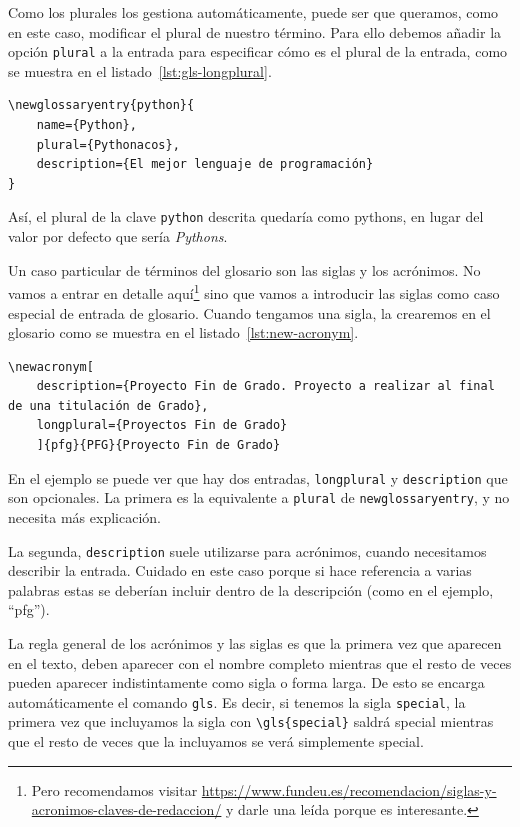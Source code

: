 \documentclass[%
    school=etsisi,%
    type=pfg,%
    degree=61CD,%
]{upm-report}
\begin{document}
Como los plurales los gestiona automáticamente, puede ser que queramos, como en este caso, modificar el plural de nuestro término. Para ello debemos añadir la opción \texttt{plural} a la entrada para especificar cómo es el plural de la entrada, como se muestra en el listado~\ref{lst:gls-longplural}.

\begin{lstlisting}[language={[latex]TeX},caption=Especificando el plural para un término del glosario,label=lst:gls-longplural]
\newglossaryentry{python}{
    name={Python},
    plural={Pythonacos},
    description={El mejor lenguaje de programación}
}
\end{lstlisting}

Así, el plural de la clave \texttt{python} descrita quedaría como \glspl{python}, en lugar del valor por defecto que sería \textit{Pythons}.

Un caso particular de términos del glosario son las siglas y los acrónimos. No vamos a entrar en detalle aquí\footnote{Pero recomendamos visitar \href{https://www.fundeu.es/recomendacion/siglas-y-acronimos-claves-de-redaccion/}{https://www.fundeu.es/recomendacion/siglas-y-acronimos-claves-de-redaccion/} y darle una leída porque es interesante.} sino que vamos a introducir las siglas como caso especial de entrada de glosario. Cuando tengamos una sigla, la crearemos en el glosario como se muestra en el listado~\ref{lst:new-acronym}.

\begin{lstlisting}[language={[latex]TeX},caption=Entrada genérica de una sigla o acrónimo en el glosario,label=lst:new-acronym]
\newacronym[
    description={Proyecto Fin de Grado. Proyecto a realizar al final de una titulación de Grado},
    longplural={Proyectos Fin de Grado}
    ]{pfg}{PFG}{Proyecto Fin de Grado}
\end{lstlisting}

En el ejemplo se puede ver que hay dos entradas, \texttt{longplural} y \texttt{description} que son opcionales. La primera es la equivalente a \texttt{plural} de \texttt{newglossaryentry}, y no necesita más explicación.

La segunda, \texttt{description} suele utilizarse para acrónimos, cuando necesitamos describir la entrada. Cuidado en este caso porque si hace referencia a varias palabras estas se deberían incluir dentro de la descripción (como en el ejemplo, \enquote{\acrlong{pfg}}).

La regla general de los acrónimos y las siglas es que la primera vez que aparecen en el texto, deben aparecer con el nombre completo mientras que el resto de veces pueden aparecer indistintamente como sigla o forma larga. De esto se encarga automáticamente el comando \texttt{gls}. Es decir, si tenemos la sigla \texttt{special}, la primera vez que incluyamos la sigla con \texttt{\textbackslash gls\{special\}} saldrá \gls{special} mientras que el resto de veces que la incluyamos se verá simplemente \gls{special}.
\end{document}
